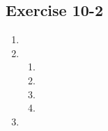 \subsection{Exercise 10-2} %
    \begin{enumerate}[itemsep=5pt, label=\textbf{\arabic*}. ]
   \item %
\item
    \begin{enumerate}[noitemsep, label=\textbf{(\alph*)} ]

    \item %
    \item %
    \item %
    \item %
    \end{enumerate}
 \item %
    \begin{enumerate}[noitemsep, label=\textbf{(\alph*)} ]


\end{enumerate}
\end{enumerate}
